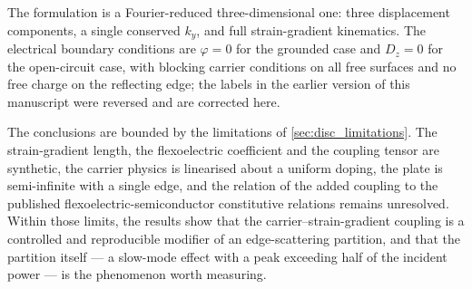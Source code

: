 The formulation is a Fourier-reduced three-dimensional one: three displacement
components, a single conserved $k_y$, and full strain-gradient kinematics.  The
electrical boundary conditions are $\varphi=0$ for the grounded case and
$D_z=0$ for the open-circuit case, with blocking carrier conditions on all free
surfaces and no free charge on the reflecting edge; the labels in the earlier
version of this manuscript were reversed and are corrected here.

The conclusions are bounded by the limitations of \cref{sec:disc_limitations}.
The strain-gradient length, the flexoelectric coefficient and the coupling
tensor are synthetic, the carrier physics is linearised about a uniform doping,
the plate is semi-infinite with a single edge, and the relation of the added
coupling to the published flexoelectric-semiconductor constitutive relations
remains unresolved.  Within those limits, the results show that the
carrier--strain-gradient coupling is a controlled and reproducible modifier of
an edge-scattering partition, and that the partition itself --- a slow-mode
effect with a peak exceeding half of the incident power --- is the phenomenon
worth measuring.
